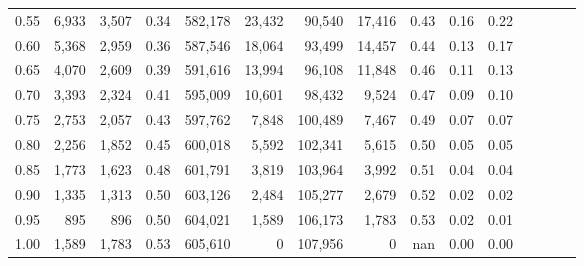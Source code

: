 \begin{tabular}{rrrcrrrrrrrrrrr}
0.55 &    6,933 &   3,507 &                                       0.34 &  582,178 &   23,432 &   90,540 &   17,416 &  0.43 &  0.16 &                         0.22 \\
0.60 &    5,368 &   2,959 &                                       0.36 &  587,546 &   18,064 &   93,499 &   14,457 &  0.44 &  0.13 &                         0.17 \\
0.65 &    4,070 &   2,609 &                                       0.39 &  591,616 &   13,994 &   96,108 &   11,848 &  0.46 &  0.11 &                         0.13 \\
0.70 &    3,393 &   2,324 &                                       0.41 &  595,009 &   10,601 &   98,432 &    9,524 &  0.47 &  0.09 &                         0.10 \\
0.75 &    2,753 &   2,057 &                                       0.43 &  597,762 &    7,848 &  100,489 &    7,467 &  0.49 &  0.07 &                         0.07 \\
0.80 &    2,256 &   1,852 &                                       0.45 &  600,018 &    5,592 &  102,341 &    5,615 &  0.50 &  0.05 &                         0.05 \\
0.85 &    1,773 &   1,623 &                                       0.48 &  601,791 &    3,819 &  103,964 &    3,992 &  0.51 &  0.04 &                         0.04 \\
0.90 &    1,335 &   1,313 &                                       0.50 &  603,126 &    2,484 &  105,277 &    2,679 &  0.52 &  0.02 &                         0.02 \\
0.95 &      895 &     896 &                                       0.50 &  604,021 &    1,589 &  106,173 &    1,783 &  0.53 &  0.02 &                         0.01 \\
1.00 &    1,589 &   1,783 &                                       0.53 &  605,610 &        0 &  107,956 &        0 &   nan &  0.00 &                         0.00 \\
\bottomrule
\end{tabular}
